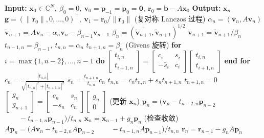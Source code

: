 \begin{algorithm}[H]\caption{{QMR\_SYM 方法 (注意: $(\bar{\bm a},\bm b)=\bm a^{\top}\bm b$)}}\label{alg:qmr-sym}\begin{algorithmic}[1]
\Statex\textbf{Input:} $\bm x_0\in\mathbb C^N,\ \beta_0=0,\ \bm v_0=\bm p_{-1}=\bm p_0=\bm0,\ \bm r_0=\bm b-A\bm x_0$
\Statex\textbf{Output:} $\bm x_n$
\State $\bm g=(\|\bm r_0\|,0,\ldots,0)^{\top},\ \bm v_1=\bm r_0/\|\bm r_0\|$
\State ({复对称 Lanczos 过程})
\State $\alpha_n=(\bar{\bm v}_n,A\bm v_n)$
\State $\widetilde{\bm v}_{n+1}=A\bm v_n-\alpha_n\bm v_n-\beta_{n-1}\bm v_{n-1}$
\State $\beta_n=(\overline{\widetilde{\bm v}_{n+1}},\widetilde{\bm v}_{n+1})^{1/2}$
\State $\bm v_{n+1}=\widetilde{\bm v}_{n+1}/\beta_n$
\State $t_{n-1,n}=\beta_{n-1},\ t_{n,n}=\alpha_n$
\State $t_{n+1,n}=\beta_n$
\State (Givens {旋转})
\State \textbf{for} $i=\max\{1,n-2\},\ldots,n-1$ \textbf{do}
\State $\begin{bmatrix}t_{i,n}\\t_{i+1,n}\end{bmatrix}=\begin{bmatrix}c_i&s_i\\-\bar s_i&c_i\end{bmatrix}\begin{bmatrix}t_{i,n}\\t_{i+1,n}\end{bmatrix}$
\State \textbf{end for}
\State $c_n=\frac{|t_{n,n}|}{\sqrt{|t_{n,n}|^2+|t_{n+1,n}|^2}}$
\State $\bar s_n=\frac{t_{n+1,n}}{t_{n,n}}c_n$
\State $t_{n,n}=c_nt_{n,n}+s_nt_{n+1,n}$
\State $t_{n+1,n}=0$
\State $\begin{bmatrix}g_n\\g_{n+1}\end{bmatrix}=\begin{bmatrix}c_n&s_n\\-\bar s_n&c_n\end{bmatrix}\begin{bmatrix}g_n\\0\end{bmatrix}$
\State ({更新} $\bm x_n$)
\State $\bm p_n=(\bm v_n-t_{n-2,n}\bm p_{n-2}$
\State $\qquad-t_{n-1,n}\bm p_{n-1})/t_{n,n}$
\State $\bm x_n=\bm x_{n-1}+g_n\bm p_n$
\State ({检查收敛})
\State $A\bm p_n=(A\bm v_n-t_{n-2,n}A\bm p_{n-2}$
\State $\qquad-t_{n-1,n}A\bm p_{n-1})/t_{n,n}$
\State $\bm r_n=\bm r_{n-1}-g_nA\bm p_n$
\EndFor\end{algorithmic}\end{algorithm}
